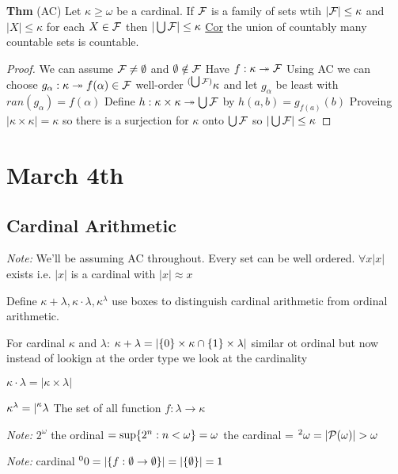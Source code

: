 \textbf{Thm} (AC) Let $\kappa \geq \omega$ be a cardinal.
If $\mathcal F$ is a family of sets wtih $|\mathcal F| \leq \kappa$ and $|X| \leq \kappa$ for each $X \in \mathcal F$ then $|\bigcup \mathcal F| \leq \kappa$
\underline{Cor} the union of countably many countable sets is countable.

\begin{proof}
    We can assume $\mathcal F \neq \emptyset$ and $\emptyset \notin \mathcal F$
    Have $f : \kappa \twoheadrightarrow \mathcal F$
    Using AC we can choose $g_\alpha : \kappa \twoheadrightarrow f(\alpha) \in \mathcal F$
    well-order $\leftsuperscript{\kappa}{(\bigcup \FF)}$ and let $g_\alpha$ be least with $ran(g_\alpha)=f(\alpha)$
    Define $h: \kappa \times \kappa \twoheadrightarrow \bigcup \mathcal F$ by
    $h(a,b) = g_{f(a)}(b)$
    Proveing $|\kappa \times \kappa| = \kappa$ so there is a surjection for $\kappa$ onto $\bigcup \mathcal F$ so $|\bigcup \mathcal F| \leq \kappa$
    \end{proof}

\section{March 4th}

\subsection{Cardinal Arithmetic}
\emph{Note:} We'll be assuming AC throughout.
Every set can be well ordered.
$\forall x |x|$ exists i.e. $|x|$ is a cardinal with $|x| \approx x$

Define $\kappa + \lambda, \kappa \cdot \lambda, \kappa^\lambda$
use boxes to distinguish cardinal arithmetic from ordinal arithmetic.

\dfn For cardinal $\kappa$ and $\lambda$:
$\kappa + \lambda = | \{0\} \times \kappa \cap \{1\} \times \lambda |$
similar ot ordinal but now instead of lookign at the order type we look at the cardinality

$\kappa \cdot \lambda = |\kappa \times \lambda|$

\newcommand{\leftsuperscript}[2]{{\vphantom{{#1}}}^{#2}{#1}}

$\kappa^\lambda = |\leftsuperscript{\lambda}{\kappa} $
The set of all function $f : \lambda \rightarrow \kappa$

\emph{Note:} $2^\omega$ the ordinal $= \sup\{2^n : n < \omega\} = \omega$
the cardinal = $\leftsuperscript{\omega}{2} = |\PP(\omega)| > \omega$

\emph{Note: } cardinal $\leftsuperscript{0}{0} = | \set{f : \emptyset \rightarrow \emptyset}| = |\set{\emptyset}| = 1$

